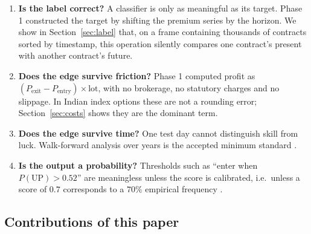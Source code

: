 \documentclass[11pt,a4paper]{article}
\newcommand{\Pup}{P(\text{UP})}
\begin{document}
\begin{enumerate}
  \item \textbf{Is the label correct?} A classifier is only as meaningful as its target.
        Phase 1 constructed the target by shifting the premium series by the horizon.
        We show in Section~\ref{sec:label} that, on a frame containing thousands of
        contracts sorted by timestamp, this operation silently compares one contract's
        present with another contract's future.
  \item \textbf{Does the edge survive friction?} Phase 1 computed profit as
        $(P_{\text{exit}}-P_{\text{entry}})\times\text{lot}$, with no brokerage, no
        statutory charges and no slippage. In Indian index options these are not a
        rounding error; Section~\ref{sec:costs} shows they are the dominant term.
  \item \textbf{Does the edge survive time?} One test day cannot distinguish skill from
        luck. Walk-forward analysis over years is the accepted minimum standard
        \cite{pardo,wfowiki}.
  \item \textbf{Is the output a probability?} Thresholds such as ``enter when
        $\Pup>0.52$'' are meaningless unless the score is calibrated, i.e.\ unless
        a score of $0.7$ corresponds to a $70\%$ empirical frequency
        \cite{zadrozny,sklearncalib}.
\end{enumerate}

\subsection{Contributions of this paper}
\end{document}
